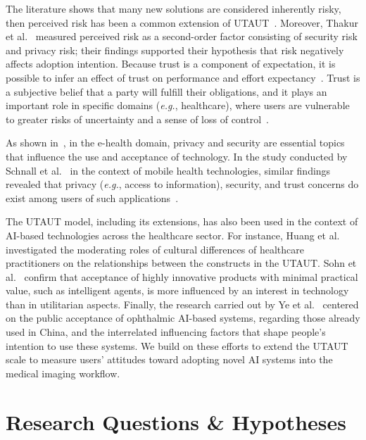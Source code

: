 The literature shows that many new solutions are considered inherently risky, then perceived risk has been a common extension of UTAUT~\cite{KHALILZADEH2017460, https://doi.org/10.1002/mar.20823, williams2011utaut}.
Moreover, Thakur et al.~\cite{Thakur2014} measured perceived risk as a second-order factor consisting of security risk and privacy risk; their findings supported their hypothesis that risk negatively affects adoption intention.
Because trust is a component of expectation, it is possible to infer an effect of trust on performance and effort expectancy~\cite{Lee:2013:0301-2212:587}.
Trust is a subjective belief that a party will fulfill their obligations, and it plays an important role in specific domains ({\it e.g.}, healthcare), where users are vulnerable to greater risks of uncertainty and a sense of loss of control~\cite{LU2011393, ZHOU20131085}.

As shown in~\cite{6038874}, in the e-health domain, privacy and security are essential topics that influence the use and acceptance of technology.
In the study conducted by Schnall et al.~\cite{Schnall2015} in the context of mobile health technologies, similar findings revealed that privacy ({\it e.g.}, access to information), security, and trust concerns do exist among users of such applications~\cite{10.1145/3132272.3134111}.

The UTAUT model, including its extensions, has also been used in the context of AI-based technologies across the healthcare sector.
For instance, Huang et al.~\cite{huang2010cultural} investigated the moderating roles of cultural differences of healthcare practitioners on the relationships between the constructs in the UTAUT.
Sohn et al.~\cite{SOHN2020101324} confirm that acceptance of highly innovative products with minimal practical value, such as intelligent agents, is more influenced by an interest in technology than in utilitarian aspects.
Finally, the research carried out by Ye et al.~\cite{info:doi/10.2196/14316} centered on the public acceptance of ophthalmic AI-based systems, regarding those already used in China, and the interrelated influencing factors that shape people’s intention to use these systems.
We build on these efforts to extend the UTAUT scale to measure users’ attitudes toward adopting novel AI systems into the medical imaging workflow.

\section{Research Questions \& Hypotheses}
\label{sec:chap004003}

